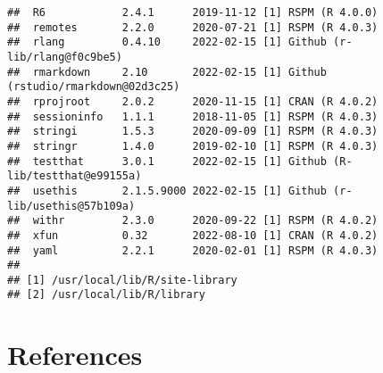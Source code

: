 \documentclass[
]{book}
\begin{document}
\begin{verbatim}
##  R6            2.4.1      2019-11-12 [1] RSPM (R 4.0.0)                    
##  remotes       2.2.0      2020-07-21 [1] RSPM (R 4.0.3)                    
##  rlang         0.4.10     2022-02-15 [1] Github (r-lib/rlang@f0c9be5)      
##  rmarkdown     2.10       2022-02-15 [1] Github (rstudio/rmarkdown@02d3c25)
##  rprojroot     2.0.2      2020-11-15 [1] CRAN (R 4.0.2)                    
##  sessioninfo   1.1.1      2018-11-05 [1] RSPM (R 4.0.3)                    
##  stringi       1.5.3      2020-09-09 [1] RSPM (R 4.0.3)                    
##  stringr       1.4.0      2019-02-10 [1] RSPM (R 4.0.3)                    
##  testthat      3.0.1      2022-02-15 [1] Github (R-lib/testthat@e99155a)   
##  usethis       2.1.5.9000 2022-02-15 [1] Github (r-lib/usethis@57b109a)    
##  withr         2.3.0      2020-09-22 [1] RSPM (R 4.0.2)                    
##  xfun          0.32       2022-08-10 [1] CRAN (R 4.0.2)                    
##  yaml          2.2.1      2020-02-01 [1] RSPM (R 4.0.3)                    
## 
## [1] /usr/local/lib/R/site-library
## [2] /usr/local/lib/R/library
\end{verbatim}

\hypertarget{references}{%
\chapter*{References}\label{references}}
\end{document}
